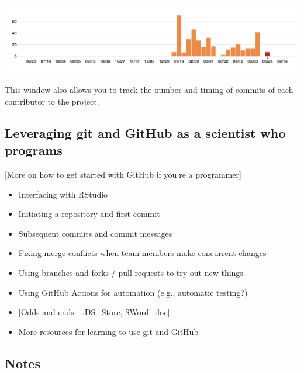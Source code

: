 \documentclass[]{tufte-book}
\providecommand{\tightlist}{%
  \setlength{\itemsep}{0pt}\setlength{\parskip}{0pt}}
\begin{document}
\includegraphics[width=20.53in]{figures/github_commit_frequency}

This window also allows you to track the number and timing of commits of each contributor
to the project.

\hypertarget{leveraging-git-and-github-as-a-scientist-who-programs}{%
\subsection{Leveraging git and GitHub as a scientist who programs}\label{leveraging-git-and-github-as-a-scientist-who-programs}}

{[}More on how to get started with GitHub if you're a programmer{]}

\begin{itemize}
\tightlist
\item
  Interfacing with RStudio
\item
  Initiating a repository and first commit
\item
  Subsequent commits and commit messages
\item
  Fixing merge conflicts when team members make concurrent changes
\item
  Using branches and forks / pull requests to try out new things
\item
  Using GitHub Actions for automation (e.g., automatic testing?)
\item
  {[}Odds and ends---.DS\_Store, \$Word\_doc{]}
\item
  More resources for learning to use git and GitHub
\end{itemize}

\hypertarget{notes}{%
\subsection{Notes}\label{notes}}
\end{document}
